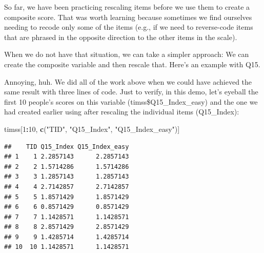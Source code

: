 \documentclass[
]{article}
\newenvironment{Shaded}{\begin{snugshade}}{\end{snugshade}}
\newcommand{\DataTypeTok}[1]{\textcolor[rgb]{0.13,0.29,0.53}{#1}}
\newcommand{\DecValTok}[1]{\textcolor[rgb]{0.00,0.00,0.81}{#1}}
\newcommand{\KeywordTok}[1]{\textcolor[rgb]{0.13,0.29,0.53}{\textbf{#1}}}
\newcommand{\NormalTok}[1]{#1}
\newcommand{\OperatorTok}[1]{\textcolor[rgb]{0.81,0.36,0.00}{\textbf{#1}}}
\newcommand{\OtherTok}[1]{\textcolor[rgb]{0.56,0.35,0.01}{#1}}
\newcommand{\StringTok}[1]{\textcolor[rgb]{0.31,0.60,0.02}{#1}}
\begin{document}
So far, we have been practicing rescaling items before we use them to create a composite score. That was worth learning because sometimes we find ourselves needing to recode only some of the items (e.g., if we need to reverse-code items that are phrased in the opposite direction to the other items in the scale).

When we do not have that situation, we can take a simpler approach: We can create the composite variable and then rescale that. Here's an example with Q15.

\begin{Shaded}
\end{Shaded}

Annoying, huh. We did all of the work above when we could have achieved the same result with three lines of code. Just to verify, in this demo, let's eyeball the first 10 people's scores on this variable (timss\$Q15\_Index\_easy) and the one we had created earlier using after rescaling the individual items (Q15\_Index):

\begin{Shaded}
\begin{Highlighting}[]
\NormalTok{timss[}\DecValTok{1}\OperatorTok{:}\DecValTok{10}\NormalTok{, }\KeywordTok{c}\NormalTok{(}\StringTok{"TID"}\NormalTok{, }\StringTok{"Q15_Index"}\NormalTok{, }\StringTok{"Q15_Index_easy"}\NormalTok{)]}
\end{Highlighting}
\end{Shaded}

\begin{verbatim}
##    TID Q15_Index Q15_Index_easy
## 1    1 2.2857143      2.2857143
## 2    2 1.5714286      1.5714286
## 3    3 1.2857143      1.2857143
## 4    4 2.7142857      2.7142857
## 5    5 1.8571429      1.8571429
## 6    6 0.8571429      0.8571429
## 7    7 1.1428571      1.1428571
## 8    8 2.8571429      2.8571429
## 9    9 1.4285714      1.4285714
## 10  10 1.1428571      1.1428571
\end{verbatim}
\end{document}
